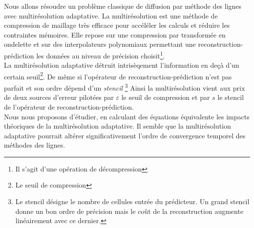 Nous allons résoudre un problème classique de diffusion par méthode des lignes avec multirésolution adaptative.
La multirésolution est une méthode de compression de maillage très efficace pour accéléler les calculs et réduire les contraintes mémoires.
Elle repose sur une compression par transformée en ondelette et sur des interpolateurs polynomiaux permettant une reconstruction-prédiction
les données au niveau de précision choisit\footnote{Il s'agit d'une opération de décompression}.\\
La multirésolution adaptative détruit intrisèqement l'information en deçà d'un certain seuil\footnote{Le seuil de compression}. De même 
si l'opérateur de reconstruction-prédiction n'est pas parfait et son ordre dépend d'un \textit{stencil}
\footnote{Le stencil désigne le nombre de cellules entrée du prédicteur. Un grand stencil donne un bon ordre de précision mais le coût de la reconstruction
augmente linéairement avec ce dernier.} Ainsi la multirésolution vient aux prix de deux sources d'erreur pilotées par $\varepsilon$ le seuil de compression
et par $s$ le stencil de l'opérateur de reconstruction-prédiction.\\
Nous nous proposons d'étudier, en calculant des équations équivalente les impacts théoriques de la multirésolution adaptative. Il semble que la multirésolution adaptative
pourrait altérer significativement l'ordre de convergence temporel des méthodes des lignes.